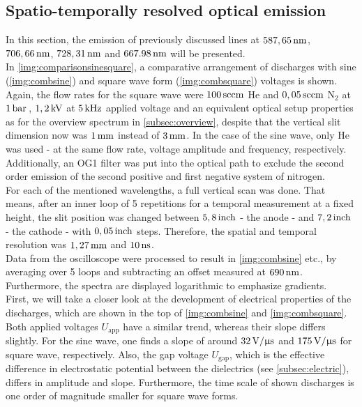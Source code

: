 \documentclass[a4paper,10pt,twoside]{article}
\newcommand{\ix}[1]{_\text{#1}}
\begin{document}
		\subsection{Spatio-temporally resolved optical emission}\label{subsec:stroe}
		
			In this section, the emission of previously discussed lines at $\unit[587,65]{nm}$, $\unit[706,66]{nm}$, $\unit[728,31]{nm}$ and $\unit[667.98]{nm}$ will be presented.\\
			In \autoref{img:comparisonsinesquare}, a comparative arrangement of discharges with sine (\autoref{img:combsine}) and square wave form (\autoref{img:combsquare}) voltages is shown. Again, the flow rates for the square wave were $\unit[100]{sccm}$ He and $\unit[0,05]{sccm}$ N$_2$ at $\unit[1]{bar}$\,, $\unit[1,2]{kV}$ at $\unit[5]{kHz}$ applied voltage and an equivalent optical setup properties as for the overview spectrum in \autoref{subsec:overview}, despite that the vertical slit dimension now was $\unit[1]{mm}$ instead of $\unit[3]{mm}$. In the case of the sine wave,	only He was used - at the same flow rate, voltage amplitude and frequency, respectively. Additionally, an OG1 filter was put into the optical path to exclude the second order emission of the second positive and first negative system of nitrogen.\\
			For each of the mentioned wavelengths, a full vertical scan was done. That means, after an inner loop of 5 repetitions for a temporal measurement at a fixed height, the slit position was changed between $\unit[5,8]{inch}$ - the anode - and $\unit[7,2]{inch}$ - the cathode - with $\unit[0,05]{inch}$ steps. Therefore, the spatial and temporal resolution was $\unit[1,27]{mm}$ and $\unit[10]{ns}$.\\
			Data from the oscilloscope were processed to result in \autoref{img:combsine} etc., by averaging over 5 loops and subtracting an offset measured at $\unit[690]{nm}$. Furthermore, the spectra are displayed logarithmic to emphasize gradients.\\
			First, we will take a closer look at the development of electrical properties of the discharges, which are shown in the top of \autoref{img:combsine} and \autoref{img:combsquare}. Both applied voltages $U\ix{app}$ have a similar trend, whereas their slope differs slightly. For the sine wave, one finds a slope of around $\unit[32]{V/\upmu s}$ and $\unit[175]{V/\upmu s}$ for square wave, respectively. Also, the gap voltage $U\ix{gap}$, which is the effective difference in electrostatic potential between the dielectrics (see \autoref{subsec:electric}), differs in amplitude and slope. Furthermore, the time scale of shown discharges is one order of magnitude smaller for square wave forms.\\
\end{document}
